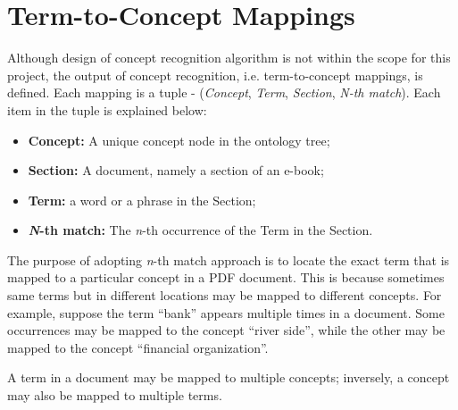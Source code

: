 \section{Term-to-Concept Mappings}
Although design of concept recognition algorithm is not within the scope for this project, the output of concept recognition, i.e. term-to-concept mappings, is defined. Each mapping is a tuple - (\textit{Concept}, \textit{Term}, \textit{Section}, \textit{N-th match}). Each item in the tuple is explained below:

\begin{itemize}
\item \textbf{Concept:} A unique concept node in the ontology tree;
\item \textbf{Section:} A document, namely a section of an e-book;
\item \textbf{Term:} a word or a phrase in the Section;
\item \textbf{\textit{N}-th match:} The \textit{n}-th occurrence of the Term in the Section.
\end{itemize}

The purpose of adopting \textit{n}-th match approach is to locate the exact term that is mapped to a particular concept in a PDF document. This is because sometimes same terms but in different locations may be mapped to different concepts. For example, suppose the term \enquote{bank} appears multiple times in a document. Some occurrences may be mapped to the concept \enquote{river side}, while the other may be mapped to the concept \enquote{financial organization}.

A term in a document may be mapped to multiple concepts; inversely, a concept may also be mapped to multiple terms.
